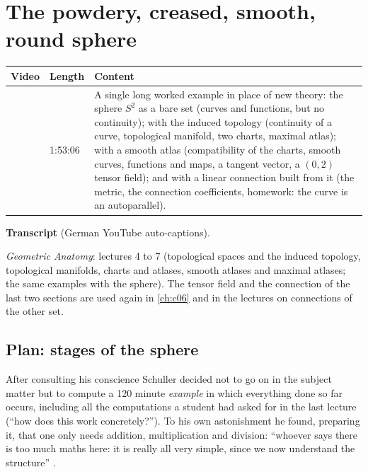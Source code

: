 \chapter{The powdery, creased, smooth, round sphere}\label{ch:c07}
\begin{paracol}{2}

\begin{sources}
\begin{tabularx}{\linewidth}{@{}l l L@{}}
\toprule
\textbf{Video} & \textbf{Length} & \textbf{Content}\\
\midrule
{} & 1:53:06 & A single long worked example in place of new
theory: the sphere $S^2$ as a bare set (curves and functions, but no continuity); with the induced topology (continuity of a
curve, topological manifold, two charts, maximal atlas); with a smooth atlas (compatibility of the charts, smooth curves,
functions and maps, a tangent vector, a $(0,2)$ tensor field); and with a linear connection built from it (the metric, the
connection coefficients, homework: the curve is an autoparallel).\\
\bottomrule
\end{tabularx}

\smallskip
\textbf{Transcript}  (German YouTube auto-captions).
\end{sources}

\begin{reading}
\emph{Geometric Anatomy}: lectures 4 to 7 (topological spaces and the induced topology, topological manifolds, charts and
atlases, smooth atlases and maximal atlases; the same examples with the sphere). The tensor field and the connection of the
last two sections are used again in \cref{ch:c06} and in the lectures on connections of the other set.
\end{reading}

\section{Plan: stages of the sphere}\label{sec:sp-plan}

After consulting his conscience Schuller decided not to go on in the subject matter but to compute a 120 minute \emph{example}
in which everything done so far occurs, including all the computations a student had asked for in the last lecture (``how does
this work concretely?''). To his own astonishment he found, preparing it, that one only needs addition, multiplication and
division: ``whoever says there is too much maths here: it is really all very simple, since we now understand the structure''
.


\end{paracol}
